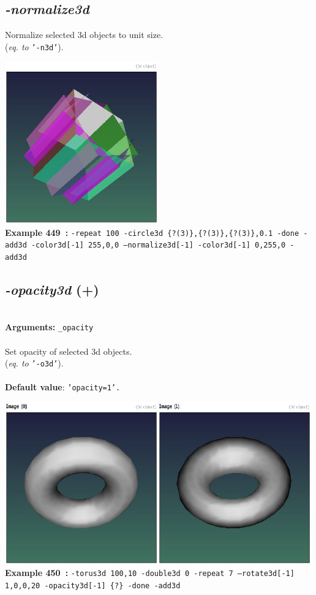 \documentclass[a4paper,11pt,twoside]{book}
\begin{document}
\subsection{\emph{-normalize3d} }\vspace*{-0.5em}
Normalize selected 3d objects to unit size.
~\\(\emph{eq. to} {\small \texttt{'-n3d'}}).
\begin{center}\includegraphics[keepaspectratio=true,height=7cm,width=\textwidth]{img/gmic_def449.jpg}\\
{\footnotesize \textbf{Example 449~:} \texttt{-repeat 100 -circle3d \{?(3)\},\{?(3)\},\{?(3)\},0.1 -done -add3d -color3d[-1] 255,0,0 --normalize3d[-1] -color3d[-1] 0,255,0 -add3d}}
\end{center}

\subsection{\emph{-opacity3d} (+)}\vspace*{-0.5em}
~\\\textbf{Arguments: } 
{\small \texttt{\_opacity}}\\~\\
Set opacity of selected 3d objects.
~\\(\emph{eq. to} {\small \texttt{'-o3d'}}).
~\\~\\\textbf{Default value}: {\small \texttt{'opacity=1'.}}
\begin{center}\includegraphics[keepaspectratio=true,height=7cm,width=\textwidth]{img/gmic_def450.jpg}\\
{\footnotesize \textbf{Example 450~:} \texttt{-torus3d 100,10 -double3d 0 -repeat 7 --rotate3d[-1] 1,0,0,20 -opacity3d[-1] \{?\} -done -add3d}}
\end{center}
\end{document}
